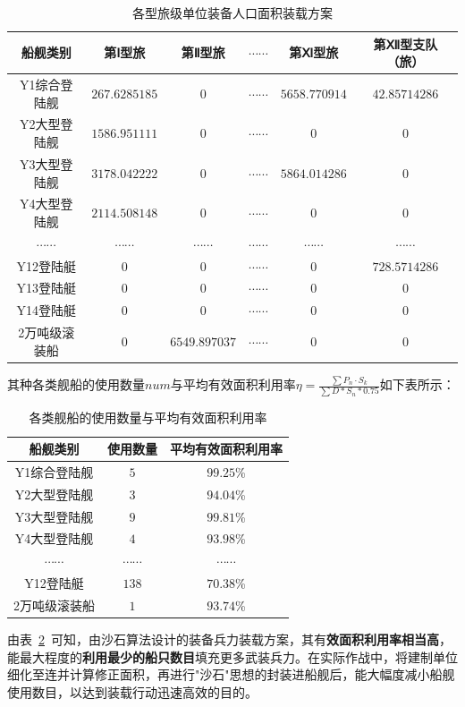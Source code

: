 \documentclass{whutmod}
\begin{document}
\begin{table}[H]
\centering		\caption{各型旅级单位装备人口面积装载方案}\label{zhuangzai}
\begin{tabular}{cccccc}
	\toprule[2pt]
	\multicolumn{1}{m{2cm}}{\centering 船舰类别}
	& \multicolumn{1}{m{2cm}}{\centering 第Ⅰ型旅}
	&\multicolumn{1}{m{2cm}}{\centering 第Ⅱ型旅}
	& \multicolumn{1}{m{3cm}}{\centering $ \cdots \cdots  $}
	& \multicolumn{1}{m{2cm}}{\centering 第Ⅺ型旅}
	& \multicolumn{1}{m{2cm}}{\centering 第Ⅻ型支队（旅）}
	\\
	\midrule[1pt]
	Y1综合登陆舰 &  $267.6285185$  &$0$ & $\cdots \cdots$&$5658.770914
	$ &$42.85714286$ \\ 
	Y2大型登陆舰	 &  $1586.951111$&$0$& $\cdots \cdots$ &$0$ &$0$\\ 
	Y3大型登陆舰	 &  $3178.042222 $ &$0$& $\cdots \cdots$ &$5864.014286
	$ &$0$\\ 
	Y4大型登陆舰	 &  $2114.508148 $ &$0$& $\cdots \cdots$ &$0
	$ &$0$\\ 
	$\cdots \cdots$	 &  $\cdots \cdots$  &$\cdots \cdots$ &$\cdots \cdots$ &$\cdots \cdots$ &$\cdots \cdots$\\ 
	Y12登陆艇	 &  $0$ &$0$ & $\cdots \cdots$ &$0$ &$728.5714286$\\ 
	Y13登陆艇	 &  $0$ &$0$ & $\cdots \cdots$ &$0$ &$0$\\ 
	Y14登陆艇		 &  $0$ &$0$ & $\cdots \cdots$ &$0$ &$0$\\ 
	2万吨级滚装船  &  $0 $ &$6549.897037$& $\cdots \cdots$ &$0$ &$0$ \\ 
	\bottomrule[2pt]	
\end{tabular}
\end{table}

	其种各类舰船的使用数量$num$与平均有效面积利用率$\eta=\frac{\sum P_{n}\cdot S_{k}}{\sum D*S_{n}*0.75}$如下表所示：
	\begin{table}[H]
		\centering		\caption{各类舰船的使用数量与平均有效面积利用率}\label{zhuansasgzai}
		\begin{tabular}{ccc}
			\toprule[2pt]
			\multicolumn{1}{m{3cm}}{\centering 船舰类别}
			& \multicolumn{1}{m{3cm}}{\centering 使用数量}
			&\multicolumn{1}{m{3cm}}{\centering 平均有效面积利用率}
			\\
			\midrule[1pt]
			Y1综合登陆舰 &  $5$  &$99.25$\% \\ 
			Y2大型登陆舰	 &  $3$&$94.04$\%\\ 
			Y3大型登陆舰	 &  $9 $ &$99.81$\%\\ 
			Y4大型登陆舰	 &  $4$ &$93.98$\%\\ 
			$\cdots \cdots$	 & 	$\cdots \cdots$&	$\cdots \cdots$\\ 
			Y12登陆艇	 &  $138$ &$70.38$\%\\ 
			2万吨级滚装船  &  $1 $ &$93.74$\% \\ 
			\bottomrule[2pt]	
		\end{tabular}
	\end{table}
由表~\ref{zhuansasgzai}~可知，由沙石算法设计的装备兵力装载方案，其有\textbf{效面积利用率相当高}，能最大程度的\textbf{利用最少的船只数目}填充更多武装兵力。在实际作战中，将建制单位细化至连并计算修正面积，再进行"沙石"思想的封装进船舰后，能大幅度减小船舰使用数目，以达到装载行动迅速高效的目的。
	
\end{document}
